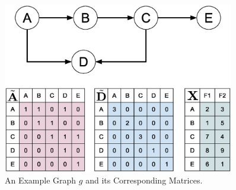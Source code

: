 \begin{figure}[htbp]
\centerline{\includegraphics[width=0.90\textwidth]{Magic/figures/ExampleGraph.eps}}
\caption{An Example Graph $g$ and its Corresponding Matrices.}
\label{MG:Fig:ExampleGraph}
\end{figure}


